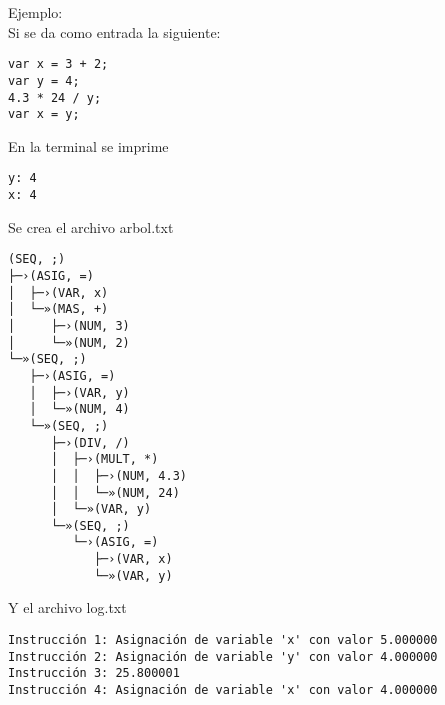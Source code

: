\documentclass[12pt]{article}
\begin{document}
Ejemplo: \\

Si se da como entrada la siguiente:
\begin{verbatim}
var x = 3 + 2;
var y = 4;
4.3 * 24 / y;
var x = y;
\end{verbatim}

En la terminal se imprime
\begin{verbatim}
y: 4
x: 4
\end{verbatim}

Se crea el archivo \textsf{arbol.txt}
\begin{verbatim}
(SEQ, ;)
├─›(ASIG, =)
│  ├─›(VAR, x)
│  └─»(MAS, +)
│     ├─›(NUM, 3)
│     └─»(NUM, 2)
└─»(SEQ, ;)
   ├─›(ASIG, =)
   │  ├─›(VAR, y)
   │  └─»(NUM, 4)
   └─»(SEQ, ;)
      ├─›(DIV, /)
      │  ├─›(MULT, *)
      │  │  ├─›(NUM, 4.3)
      │  │  └─»(NUM, 24)
      │  └─»(VAR, y)
      └─»(SEQ, ;)
         └─›(ASIG, =)
            ├─›(VAR, x)
            └─»(VAR, y)
\end{verbatim}

Y el archivo \textsf{log.txt}
\begin{verbatim}
Instrucción 1: Asignación de variable 'x' con valor 5.000000
Instrucción 2: Asignación de variable 'y' con valor 4.000000
Instrucción 3: 25.800001
Instrucción 4: Asignación de variable 'x' con valor 4.000000
\end{verbatim}
\end{document}
